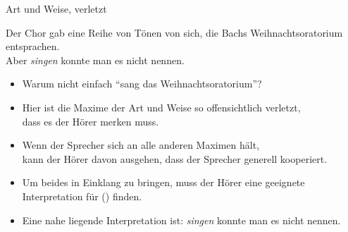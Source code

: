 \begin{frame}{Art und Weise, verletzt}

\begin{exe}
\ex Der Chor gab eine Reihe von Tönen von sich, die Bachs Weihnachtsoratorium entsprachen.\\
       \alert{Aber \textit{singen} konnte man es nicht nennen.}
\end{exe}

\begin{itemize}
\item Warum nicht einfach "`sang das Weihnachtsoratorium"'?\pause
\item Hier ist die Maxime der Art und Weise so offensichtlich verletzt,\\ dass es der Hörer merken muss.\pause
\item Wenn der Sprecher sich an alle anderen Maximen hält,\\ kann der Hörer davon ausgehen, dass der Sprecher generell kooperiert.\pause
\item Um beides in Einklang zu bringen, muss der Hörer eine geeignete  Interpretation für () finden.\pause
\item Eine nahe liegende Interpretation ist: \textit{singen} konnte man es nicht nennen.
\end{itemize}
\end{frame}





\nocite{Levinson1983}






